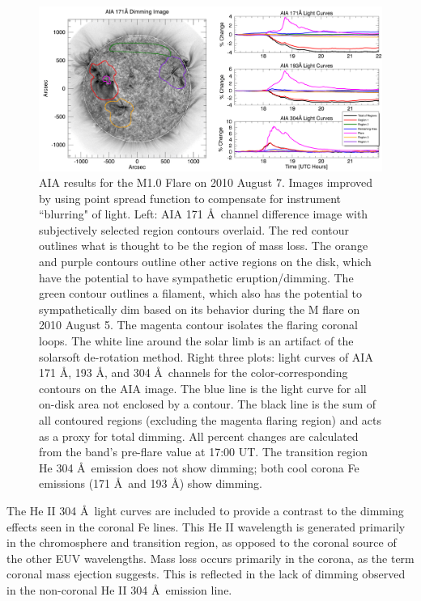 \begin{figure}[!h]
    \begin{center}
	    \includegraphics[width=166mm]{Images/Aia2010Aug7.png}
    \end{center}
    \caption[AIA contour analysis for 2010 August 7 event]{
        AIA results for the M1.0 Flare on 2010 August 7. Images improved by using point spread function to compensate for 
        instrument ``blurring" of light. Left: AIA 171 \AA\ channel difference image with subjectively 
        selected region contours overlaid. The red contour outlines what is thought to be the region of mass loss. The 
        orange and purple contours outline other active regions on the disk, which have the potential to have sympathetic 
        eruption/dimming. The green contour outlines a filament, which also has the potential to sympathetically dim based 
        on its behavior during the M flare on 2010 August 5. The magenta contour isolates the flaring coronal loops. The 
        white line around the solar limb is an artifact of the solarsoft de-rotation method. Right three plots: light 
        curves of AIA 171 \AA, 193 \AA, and 304 \AA\ channels for the color-corresponding contours on the AIA image. 
        The blue line is the light curve for all on-disk area not enclosed by a contour. The black line is the sum of 
        all contoured regions (excluding the magenta flaring region) and acts as a proxy for total dimming. 
        All percent changes are calculated from the band's pre-flare value at 17:00 UT. 
        The transition region He 304 \AA\ emission does not show dimming; both cool corona Fe emissions 
        (171 \AA\ and 193 \AA) show dimming.
	}
    \label{aia2010aug7}
\end{figure}

The He II 304 \AA\ light curves are included to provide a contrast to the dimming effects seen in the coronal Fe lines. This He II wavelength is generated primarily in the chromosphere and transition region, as opposed to the coronal source of the other EUV wavelengths. Mass loss occurs primarily in the corona, as the term coronal mass ejection suggests. This is reflected in the lack of dimming observed in the non-coronal He II 304 \AA\ emission line.


